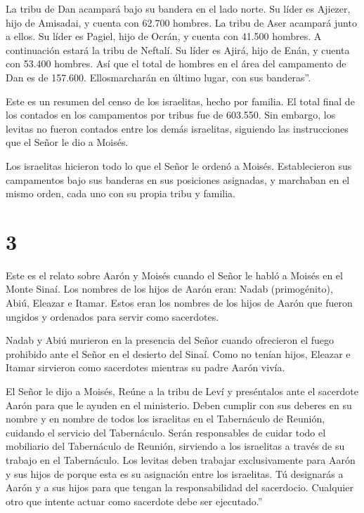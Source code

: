  La tribu de Dan acampará bajo su bandera en el lado norte.
Su líder es Ajiezer, hijo de Amisadai,  y cuenta con 62.700
hombres.  La tribu de Aser acampará junto a ellos. Su líder
es Pagiel, hijo de Ocrán,  y cuenta con 41.500 hombres.
 A continuación estará la tribu de Neftalí. Su líder es
Ajirá, hijo de Enán,  y cuenta con 53.400 hombres.
 Así que el total de hombres en el área del campamento de
Dan es de 157.600. Ellosmarcharán en último lugar, con sus banderas''.

 Este es un resumen del censo de los israelitas, hecho por
familia. El total final de los contados en los campamentos por tribus
fue de 603.550.  Sin embargo, los levitas no fueron
contados entre los demás israelitas, siguiendo las instrucciones que el
Señor le dio a Moisés.

 Los israelitas hicieron todo lo que el Señor le ordenó a
Moisés. Establecieron sus campamentos bajo sus banderas en sus
posiciones asignadas, y marchaban en el mismo orden, cada uno con su
propia tribu y familia.

\hypertarget{section-2}{%
\section{3}\label{section-2}}

 Este es el relato sobre Aarón y Moisés cuando el Señor le
habló a Moisés en el Monte Sinaí.  Los nombres de los hijos
de Aarón eran: Nadab (primogénito), Abiú, Eleazar e Itamar. 
Estos eran los nombres de los hijos de Aarón que fueron ungidos y
ordenados para servir como sacerdotes.

 Nadab y Abiú murieron en la presencia del Señor cuando
ofrecieron el fuego prohibido ante el Señor en el desierto del Sinaí.
Como no tenían hijos, Eleazar e Itamar sirvieron como sacerdotes
mientras su padre Aarón vivía.

 El Señor le dijo a Moisés,  Reúne a la tribu de
Leví y preséntalos ante el sacerdote Aarón para que le ayuden en el
ministerio.  Deben cumplir con sus deberes en su nombre y en
nombre de todos los israelitas en el Tabernáculo de Reunión, cuidando el
servicio del Tabernáculo.  Serán responsables de cuidar todo
el mobiliario del Tabernáculo de Reunión, sirviendo a los israelitas a
través de su trabajo en el Tabernáculo.  Los levitas deben
trabajar exclusivamente para Aarón y sus hijos de porque esta es su
asignación entre los israelitas.  Tú designarás a Aarón y a
sus hijos para que tengan la responsabilidad del sacerdocio. Cualquier
otro que intente actuar como sacerdote debe ser ejecutado.''

